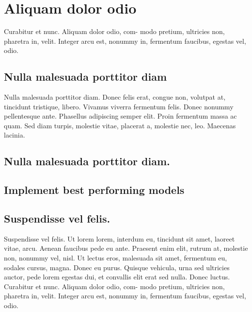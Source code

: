 \documentclass[preprint,3p,times,twocolumn]{elsarticle}  %
\begin{document}
\section{Aliquam dolor odio}\label{sec:methods}\label{sec:implementation}\label{sec:finalresults}\label{section:discussion}\label{section:conclusion}\label{sec:acknowledgment}\label{section:annexures}

Curabitur et nunc. Aliquam dolor odio, com- modo pretium, ultricies non,
 pharetra in, velit. Integer arcu est, nonummy in, fermentum faucibus, egestas 
vel, odio.

\subsection{Nulla malesuada porttitor diam}\label{subsec:sf1}%
Nulla malesuada porttitor diam. Donec felis erat, congue non, volutpat at,
 tincidunt tristique, libero. Vivamus viverra fermentum felis. Donec nonummy 
pellentesque ante. Phasellus adipiscing semper elit. Proin fermentum massa 
ac quam. Sed diam turpis, molestie vitae, placerat a, molestie nec, leo.
 Maecenas lacinia.  

\subsection{Nulla malesuada porttitor diam.}\label{subsec:sf2}
\lipsum[3-3]

\subsection{Implement best performing models}\label{subsec:sf3} 
\lipsum[4-5]
  
\subsection{Suspendisse vel felis.}\label{subsec:sf4}
Suspendisse vel felis. Ut lorem lorem, interdum eu,
tincidunt sit amet, laoreet vitae, arcu. Aenean faucibus
pede eu ante. Praesent enim elit, rutrum at, molestie
non, nonummy vel, nisl. Ut lectus eros, malesuada sit
amet, fermentum eu, sodales cursus, magna. Donec eu
purus. Quisque vehicula, urna sed ultricies auctor, pede
lorem egestas dui, et convallis elit erat sed nulla. Donec
luctus. Curabitur et nunc. Aliquam dolor odio, com-
modo pretium, ultricies non, pharetra in, velit. Integer
arcu est, nonummy in, fermentum faucibus, egestas vel,
odio.
\end{document}
